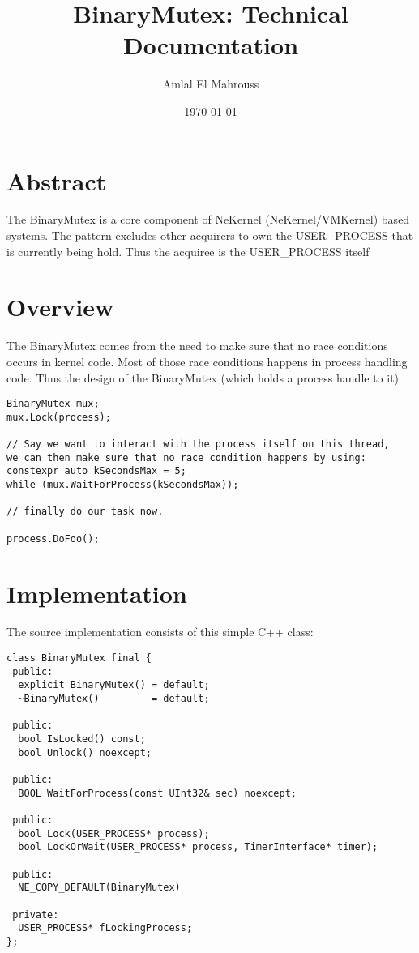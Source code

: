 \documentclass{article}
\title{BinaryMutex: Technical Documentation}
\author{Amlal El Mahrouss}
\date{\today}
\begin{document}
\maketitle

\section{Abstract}

{The BinaryMutex is a core component of NeKernel (NeKernel/VMKernel) based systems. The pattern excludes other acquirers to own the USER\_PROCESS that is currently being hold. Thus the acquiree is the USER\_PROCESS itself}

\section{Overview}

{The BinaryMutex comes from the need to make sure that no race conditions occurs in kernel code. Most of those race conditions happens in process handling code. Thus the design of the BinaryMutex (which holds a process handle to it)}

\begin{verbatim}
BinaryMutex mux;
mux.Lock(process);

// Say we want to interact with the process itself on this thread, 
we can then make sure that no race condition happens by using:
constexpr auto kSecondsMax = 5;
while (mux.WaitForProcess(kSecondsMax));

// finally do our task now.

process.DoFoo();
\end{verbatim}

\section{Implementation}

The source implementation consists of this simple C++ class:

\begin{verbatim}
class BinaryMutex final {
 public:
  explicit BinaryMutex() = default;
  ~BinaryMutex()         = default;

 public:
  bool IsLocked() const;
  bool Unlock() noexcept;

 public:
  BOOL WaitForProcess(const UInt32& sec) noexcept;

 public:
  bool Lock(USER_PROCESS* process);
  bool LockOrWait(USER_PROCESS* process, TimerInterface* timer);

 public:
  NE_COPY_DEFAULT(BinaryMutex)

 private:
  USER_PROCESS* fLockingProcess;
};
\end{verbatim}
\end{document}
